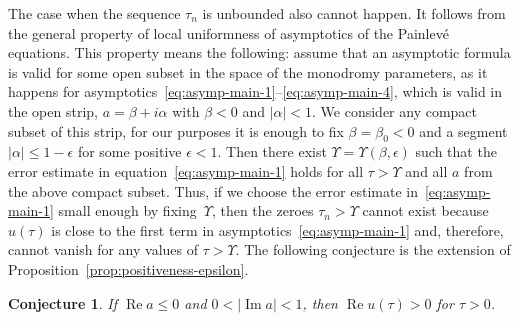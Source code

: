 \documentclass[pdftex]{sigma}
\numberwithin{equation}{section}
\newtheorem{Conjecture}[Theorem]{Conjecture}
\begin{document}
The case when the sequence $\tau_n$ is unbounded also cannot happen. It follows from the general property of local
uniformness of asymptotics of the Painlev\'e equations. This property means the following: assume that an asymptotic
formula is valid for some open subset in the space of the monodromy parameters, as it happens for
asymptotics~\eqref{eq:asymp-main-1}--\eqref{eq:asymp-main-4}, which is valid in the open strip, $a=\beta+i\alpha$
with $\beta<0$ and $|\alpha|<1$. We consider any compact subset of this strip, for our purposes
it is enough to fix $\beta=\beta_0<0$ and a segment $|\alpha|\leq1-\epsilon$ for some positive $\epsilon<1$.
Then there exist $\Upsilon=\Upsilon(\beta,\epsilon)$ such that the error estimate in equation~\eqref{eq:asymp-main-1}
holds for all $\tau>\Upsilon$ and all $a$ from the above compact subset. Thus, if we choose the error estimate in~\eqref{eq:asymp-main-1} small enough by fixing~$\Upsilon$, then the zeroes $\tau_n>\Upsilon$ cannot exist because~$u(\tau)$ is close to the first term in asymptotics~\eqref{eq:asymp-main-1} and, therefore, cannot vanish for any
values of $\tau>\Upsilon$. The following conjecture is the extension of Proposition~\ref{prop:positiveness-epsilon}.
\begin{Conjecture}\label{con:positiveness}
If $\operatorname{Re}a\leq0$ and $0<|\operatorname{Im}a|<1$, then $\operatorname{Re}u(\tau)>0$ for $\tau>0$.
\end{Conjecture}
\end{document}
